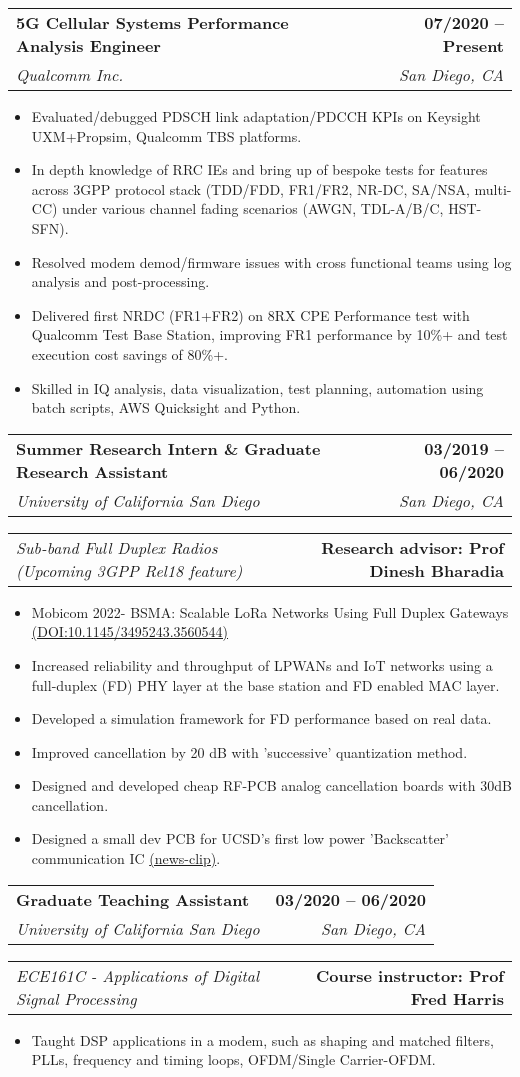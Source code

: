 \documentclass[letterpaper,11pt]{article}
\makeatletter
\newcommand{\resumeItem}[1]{
  \item\small{
    {#1 \vspace{-2pt}}
  }
}
\newcommand{\resumeSubheading}[4]{
  \vspace{-2pt}\item
    \begin{tabular*}{1.0\textwidth}[t]{l@{\extracolsep{\fill}}r}
      \textbf{#1} & \textbf{\small #2} \\
      \textit{\small#3} & \textit{\small #4} \\
    \end{tabular*}\vspace{-7pt}
}
\newcommand{\resumeProjectHeading}[2]{
    \item
    \begin{tabular*}{1.001\textwidth}{l@{\extracolsep{\fill}}r}
      \small#1 & \textbf{\small #2}\\
    \end{tabular*}\vspace{-7pt}
}
\newcommand{\resumeItemListStart}{\begin{itemize}}
\newcommand{\resumeItemListEnd}{\end{itemize}\vspace{-5pt}}
\makeatother
\begin{document}
    \resumeSubheading
      {5G Cellular Systems Performance Analysis Engineer}{07/2020 -- Present}
      {Qualcomm Inc.}{San Diego, CA}
      \resumeItemListStart
        \resumeItem{Evaluated/debugged PDSCH link adaptation/PDCCH KPIs on Keysight UXM+Propsim, Qualcomm TBS platforms.}
        \resumeItem{In depth knowledge of RRC IEs and bring up of bespoke tests for features across 3GPP protocol stack (TDD/FDD, FR1/FR2, NR-DC, SA/NSA, multi-CC) under various channel fading scenarios (AWGN, TDL-A/B/C, HST-SFN).}
        \resumeItem{Resolved modem demod/firmware issues with cross functional teams using log analysis and post-processing.}
        \resumeItem{Delivered first NRDC (FR1+FR2) on 8RX CPE Performance test with Qualcomm Test Base Station, improving FR1 performance by 10\%+ and test execution cost savings of 80\%+.}
        \resumeItem{Skilled in IQ analysis, data visualization, test planning, automation using batch scripts, AWS Quicksight and Python.}
      \resumeItemListEnd
    \resumeSubheading
      {Summer Research Intern \& Graduate Research Assistant}{03/2019 -- 06/2020}
      {University of California San Diego}{San Diego, CA}
      \vspace{-20pt}
      \resumeProjectHeading
          {\textit{\small Sub-band Full Duplex Radios (Upcoming 3GPP Rel18 feature)}}{Research advisor: Prof Dinesh Bharadia}
      \resumeItemListStart
        \resumeItem{Mobicom 2022- BSMA: Scalable LoRa Networks Using Full Duplex Gateways \href{https://rohit1347.github.io/AboutMe/mobicom22-final738.pdf}{(DOI:10.1145/3495243.3560544)}}
        \resumeItem{Increased reliability and throughput of LPWANs and IoT networks using a full-duplex (FD) PHY layer at the base station and FD enabled MAC layer.}
        \resumeItem{Developed a simulation framework for FD performance based on real data.}
        \resumeItem{Improved cancellation by 20 dB with 'successive' quantization method.}
        \resumeItem{Designed and developed cheap RF-PCB analog cancellation boards with 30dB cancellation.}
        \resumeItem{Designed a small dev PCB for UCSD’s first low power 'Backscatter' communication IC \href{https://rohit1347.github.io/AboutMe/NewChipBringsUltra-LowPowerWiFiConnectivitytoIoTDevices.pdf}{(news-clip)}.}
    \resumeItemListEnd
    
    \resumeSubheading
      {Graduate Teaching Assistant}{03/2020 -- 06/2020}
      {University of California San Diego}{San Diego, CA}
            \vspace{-20pt}
      \resumeProjectHeading
          {\textit{\small ECE161C - Applications of Digital Signal Processing}}{Course instructor: Prof Fred Harris}
      \resumeItemListStart
        \resumeItem{Taught DSP applications in a modem, such as shaping and matched filters, PLLs, frequency and timing loops, OFDM/Single Carrier-OFDM.}
    \resumeItemListEnd
\end{document}
